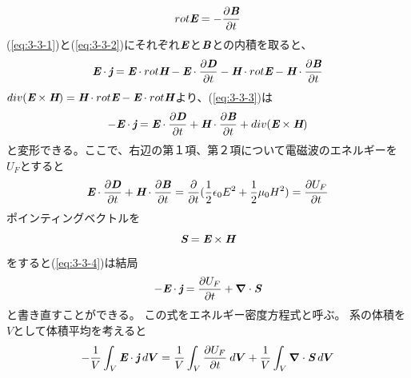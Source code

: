 \documentclass[a4paper,11pt,titlepage]{jarticle}
\newcommand{\bm}[1]{{\mbox{\boldmath $#1$}}}
\numberwithin{equation}{section} %
\begin{document}
  \begin{equation}
    \label{eq:3-3-2}
    rot \textit{\textbf{E}} = - \frac{\partial \textit{\textbf{B}} }{\partial t} 
  \end{equation}
  (\ref{eq:3-3-1})と(\ref{eq:3-3-2})にそれぞれ$\textbf{\textit{E}}$と$\textbf{\textit{B}}$との内積を取ると、
  \begin{equation}
    \label{eq:3-3-3}
    \textit{\textbf{E}} \cdot \textit{\textbf{j}} = \textit{\textbf{E}} \cdot rot \textit{\textbf{H}} - 
    \textit{\textbf{E}} \cdot \frac{\partial \textit{\textbf{D}} }{\partial t} - \textit{\textbf{H}} \cdot rot \textit{\textbf{E}}
    - \textit{\textbf{H}} \cdot \frac{\partial \textit{\textbf{B}} }{\partial t}
  \end{equation}
  $div( \textit{\textbf{E}} \times \textit{\textbf{H}} ) = 
  \textit{\textbf{H}} \cdot rot \textit{\textbf{E}} -
  \textit{\textbf{E}} \cdot rot \textit{\textbf{H}} $より、(\ref{eq:3-3-3})は
  \begin{equation}
    \label{eq:3-3-4}
    - \textit{\textbf{E}} \cdot \textit{\textbf{j}} =  
    \textit{\textbf{E}} \cdot \frac{\partial \textit{\textbf{D}} }{\partial t} 
    + \textit{\textbf{H}} \cdot \frac{\partial \textit{\textbf{B}} }{\partial t}
    + div( \textit{\textbf{E}} \times \textit{\textbf{H}} )
  \end{equation}
  と変形できる。ここで、右辺の第１項、第２項について電磁波のエネルギーを$U_F$とすると
  \begin{equation}
    \label{eq:3-3-5}  
    \textit{\textbf{E}} \cdot \frac{\partial \textit{\textbf{D}} }{\partial t} 
    + \textit{\textbf{H}} \cdot \frac{\partial \textit{\textbf{B}} }{\partial t} =
    \frac{\partial}{\partial t } (\frac{1}{2}\epsilon_0 E^2 + \frac{1}{2} \mu_0 H^2) =
    \frac{\partial U_F }{\partial t } 
  \end{equation}
  ポインティングベクトルを
  \begin{equation}
    \label{eq:3-3-6}
    \textit{\textbf{S}} = \textit{\textbf{E}} \times \textit{\textbf{H}} 
  \end{equation}
  をすると(\ref{eq:3-3-4})は結局
  \begin{equation}
    \label{eq:3-3-7}
    - \textit{\textbf{E}} \cdot \textit{\textbf{j}} =  
    \frac{\partial U_F }{\partial t }    
    + \bm{\nabla} \cdot \textit{\textbf{S}} 
  \end{equation}
  と書き直すことができる。
  この式をエネルギー密度方程式と呼ぶ。
  系の体積を$V$として体積平均を考えると
  \begin{equation}
    \label{eq:3-3-8}
     - \frac{1}{V} \int_V \textit{\textbf{E}} \cdot \textit{\textbf{j}} \: d\bm{V} 
     = \frac{1}{V} \int_V \frac{\partial U_F }{\partial t } \: d\bm{V}
     + \frac{1}{V} \int_V \bm{\nabla} \cdot \textit{\textbf{S}} \: d\bm{V}
  \end{equation}
\end{document}

